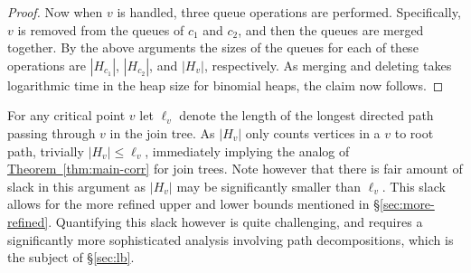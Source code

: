 \documentclass[11pt]{article}
\theoremstyle{definition}
\newcommand{\Sec}[1]{\hyperref[sec:#1]{\S\ref*{sec:#1}}} %
\newcommand{\Thm}[1]{\hyperref[thm:#1]{Theorem~\ref*{thm:#1}}} %
\begin{document}
\begin{proof}
Now when $v$ is handled, three queue operations are performed.  Specifically, $v$ is removed from the queues of $c_1$ and $c_2$, and then the queues are 
merged together.  By the above arguments the sizes of the queues for each of these operations are $|H_{c_1}|$, $|H_{c_2}|$, and $|H_v|$, respectively.  
As merging and deleting takes logarithmic time in the heap size for binomial heaps, the claim now follows.
\end{proof}


For any critical point $v$ let $\ell_v$ denote the length of the longest directed path passing through $v$ in the join tree. 
As $|H_v|$ only counts vertices in a $v$ to root path, trivially $|H_v|\leq \ell_v$, immediately implying the analog of \Thm{main-corr} for join trees.
Note however that there is fair amount of slack in this argument as $|H_v|$ may be significantly smaller than $\ell_v$.  
This slack allows for the more refined upper and lower bounds mentioned in \Sec{more-refined}.  Quantifying this slack however is quite challenging, 
and requires a significantly more sophisticated analysis involving path decompositions, which is the subject of \Sec{lb}.



\end{document}
